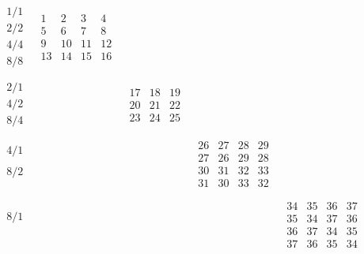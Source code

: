 \documentclass[12pt,a4paper]{amsart}
\begin{document}
\begin{align*}
  \begin{array}{r||c|c|c|c}
    \begin{array}{r}
      1/1 \\ 2/2 \\ 4/4 \\ 8/8 \\
    \end{array}
    &  \begin{array}{c|c|c|c}
    1&2&3&4\\ \hline
    5&6&7&8\\ \hline
    9&10&11&12\\ \hline
    13&14&15&16\\
  \end{array}
&&& \\ \hline
    \begin{array}{r}
      2/1 \\ 4/2 \\ 8/4 \\
    \end{array}
    &&
\begin{array}{c|c|c}
    17&18&19\\ \hline
    20&21&22\\ \hline
    23&24&25\\
  \end{array}
&& \\ \hline
    \begin{array}{r}
      4/1 \\ \\ 8/2 \\ \\
    \end{array}
    &&&
  \begin{array}{cc|cc}
    26&27&28&29\\
    27&26&29&28\\ \hline
    30&31&32&33\\
    31&30&33&32\\
  \end{array}
& \\ \hline
    \begin{array}{r}
      8/1 \\ \\ \\ \\
    \end{array}
    &&&&
  \begin{array}{cccc}
    34&35&36&37\\
    35&34&37&36\\
    36&37&34&35\\
    37&36&35&34\\
  \end{array}
 \\
  \end{array}
\end{align*}
\end{document}
